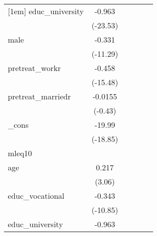 {\begin{tabular}{l*{5}{c}}
[1em]
educ\_university&      -0.963\sym{***}&                     &                     &                     &                     \\
            &    (-23.53)         &                     &                     &                     &                     \\
[1em]
male        &      -0.331\sym{***}&                     &                     &                     &                     \\
            &    (-11.29)         &                     &                     &                     &                     \\
[1em]
pretreat\_workr&      -0.458\sym{***}&                     &                     &                     &                     \\
            &    (-15.48)         &                     &                     &                     &                     \\
[1em]
pretreat\_marriedr&     -0.0155         &                     &                     &                     &                     \\
            &     (-0.43)         &                     &                     &                     &                     \\
[1em]
\_cons      &      -19.99\sym{***}&                     &                     &                     &                     \\
            &    (-18.85)         &                     &                     &                     &                     \\
\hline
mleq10      &                     &                     &                     &                     &                     \\
age         &       0.217\sym{**} &                     &                     &                     &                     \\
            &      (3.06)         &                     &                     &                     &                     \\
[1em]
educ\_vocational&      -0.343\sym{***}&                     &                     &                     &                     \\
            &    (-10.85)         &                     &                     &                     &                     \\
[1em]
educ\_university&      -0.963\sym{***}&                     &                     &                     &                     \\

\end{tabular}}
